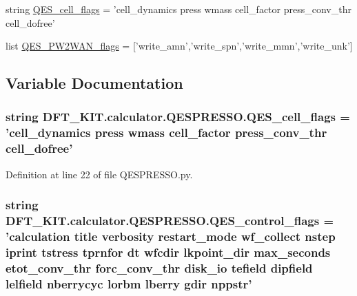 \begin{DoxyCompactItemize}
\item 
string \hyperlink{namespace_d_f_t___k_i_t_1_1calculator_1_1_q_e_s_p_r_e_s_s_o_a4f68d41dc1daf471640d1ca11f7770b3}{Q\+E\+S\+\_\+cell\+\_\+flags} = 'cell\+\_\+dynamics press wmass cell\+\_\+factor press\+\_\+conv\+\_\+thr cell\+\_\+dofree'
\item 
list \hyperlink{namespace_d_f_t___k_i_t_1_1calculator_1_1_q_e_s_p_r_e_s_s_o_a652e35119d6363d2d2d36e2da261cf71}{Q\+E\+S\+\_\+\+P\+W2\+W\+A\+N\+\_\+flags} = \mbox{[}'write\+\_\+amn','write\+\_\+spn','write\+\_\+mmn','write\+\_\+unk'\mbox{]}
\end{DoxyCompactItemize}


\subsection{Variable Documentation}
\hypertarget{namespace_d_f_t___k_i_t_1_1calculator_1_1_q_e_s_p_r_e_s_s_o_a4f68d41dc1daf471640d1ca11f7770b3}{
\subsubsection[{Q\+E\+S\+\_\+cell\+\_\+flags}]{\setlength{\rightskip}{0pt plus 5cm}string D\+F\+T\+\_\+\+K\+I\+T.\+calculator.\+Q\+E\+S\+P\+R\+E\+S\+S\+O.\+Q\+E\+S\+\_\+cell\+\_\+flags = 'cell\+\_\+dynamics press wmass cell\+\_\+factor press\+\_\+conv\+\_\+thr cell\+\_\+dofree'}}\label{namespace_d_f_t___k_i_t_1_1calculator_1_1_q_e_s_p_r_e_s_s_o_a4f68d41dc1daf471640d1ca11f7770b3}


Definition at line 22 of file Q\+E\+S\+P\+R\+E\+S\+S\+O.\+py.

\hypertarget{namespace_d_f_t___k_i_t_1_1calculator_1_1_q_e_s_p_r_e_s_s_o_af7b03c15432c08ac6f347a3a09d50a3f}{
\subsubsection[{Q\+E\+S\+\_\+control\+\_\+flags}]{\setlength{\rightskip}{0pt plus 5cm}string D\+F\+T\+\_\+\+K\+I\+T.\+calculator.\+Q\+E\+S\+P\+R\+E\+S\+S\+O.\+Q\+E\+S\+\_\+control\+\_\+flags = 'calculation title verbosity restart\+\_\+mode wf\+\_\+collect nstep iprint tstress tprnfor dt wfcdir lkpoint\+\_\+dir max\+\_\+seconds etot\+\_\+conv\+\_\+thr forc\+\_\+conv\+\_\+thr disk\+\_\+io tefield dipfield lelfield nberrycyc lorbm lberry gdir nppstr'}}\label{namespace_d_f_t___k_i_t_1_1calculator_1_1_q_e_s_p_r_e_s_s_o_af7b03c15432c08ac6f347a3a09d50a3f}


